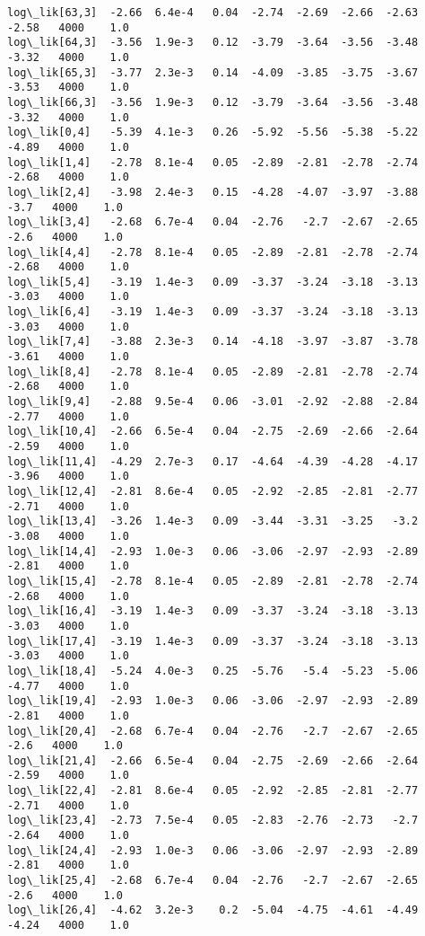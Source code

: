 \documentclass[11pt]{article}
\begin{document}
\begin{Verbatim}[commandchars=\\\{\}]
log\_lik[63,3]  -2.66  6.4e-4   0.04  -2.74  -2.69  -2.66  -2.63  -2.58   4000    1.0
log\_lik[64,3]  -3.56  1.9e-3   0.12  -3.79  -3.64  -3.56  -3.48  -3.32   4000    1.0
log\_lik[65,3]  -3.77  2.3e-3   0.14  -4.09  -3.85  -3.75  -3.67  -3.53   4000    1.0
log\_lik[66,3]  -3.56  1.9e-3   0.12  -3.79  -3.64  -3.56  -3.48  -3.32   4000    1.0
log\_lik[0,4]   -5.39  4.1e-3   0.26  -5.92  -5.56  -5.38  -5.22  -4.89   4000    1.0
log\_lik[1,4]   -2.78  8.1e-4   0.05  -2.89  -2.81  -2.78  -2.74  -2.68   4000    1.0
log\_lik[2,4]   -3.98  2.4e-3   0.15  -4.28  -4.07  -3.97  -3.88   -3.7   4000    1.0
log\_lik[3,4]   -2.68  6.7e-4   0.04  -2.76   -2.7  -2.67  -2.65   -2.6   4000    1.0
log\_lik[4,4]   -2.78  8.1e-4   0.05  -2.89  -2.81  -2.78  -2.74  -2.68   4000    1.0
log\_lik[5,4]   -3.19  1.4e-3   0.09  -3.37  -3.24  -3.18  -3.13  -3.03   4000    1.0
log\_lik[6,4]   -3.19  1.4e-3   0.09  -3.37  -3.24  -3.18  -3.13  -3.03   4000    1.0
log\_lik[7,4]   -3.88  2.3e-3   0.14  -4.18  -3.97  -3.87  -3.78  -3.61   4000    1.0
log\_lik[8,4]   -2.78  8.1e-4   0.05  -2.89  -2.81  -2.78  -2.74  -2.68   4000    1.0
log\_lik[9,4]   -2.88  9.5e-4   0.06  -3.01  -2.92  -2.88  -2.84  -2.77   4000    1.0
log\_lik[10,4]  -2.66  6.5e-4   0.04  -2.75  -2.69  -2.66  -2.64  -2.59   4000    1.0
log\_lik[11,4]  -4.29  2.7e-3   0.17  -4.64  -4.39  -4.28  -4.17  -3.96   4000    1.0
log\_lik[12,4]  -2.81  8.6e-4   0.05  -2.92  -2.85  -2.81  -2.77  -2.71   4000    1.0
log\_lik[13,4]  -3.26  1.4e-3   0.09  -3.44  -3.31  -3.25   -3.2  -3.08   4000    1.0
log\_lik[14,4]  -2.93  1.0e-3   0.06  -3.06  -2.97  -2.93  -2.89  -2.81   4000    1.0
log\_lik[15,4]  -2.78  8.1e-4   0.05  -2.89  -2.81  -2.78  -2.74  -2.68   4000    1.0
log\_lik[16,4]  -3.19  1.4e-3   0.09  -3.37  -3.24  -3.18  -3.13  -3.03   4000    1.0
log\_lik[17,4]  -3.19  1.4e-3   0.09  -3.37  -3.24  -3.18  -3.13  -3.03   4000    1.0
log\_lik[18,4]  -5.24  4.0e-3   0.25  -5.76   -5.4  -5.23  -5.06  -4.77   4000    1.0
log\_lik[19,4]  -2.93  1.0e-3   0.06  -3.06  -2.97  -2.93  -2.89  -2.81   4000    1.0
log\_lik[20,4]  -2.68  6.7e-4   0.04  -2.76   -2.7  -2.67  -2.65   -2.6   4000    1.0
log\_lik[21,4]  -2.66  6.5e-4   0.04  -2.75  -2.69  -2.66  -2.64  -2.59   4000    1.0
log\_lik[22,4]  -2.81  8.6e-4   0.05  -2.92  -2.85  -2.81  -2.77  -2.71   4000    1.0
log\_lik[23,4]  -2.73  7.5e-4   0.05  -2.83  -2.76  -2.73   -2.7  -2.64   4000    1.0
log\_lik[24,4]  -2.93  1.0e-3   0.06  -3.06  -2.97  -2.93  -2.89  -2.81   4000    1.0
log\_lik[25,4]  -2.68  6.7e-4   0.04  -2.76   -2.7  -2.67  -2.65   -2.6   4000    1.0
log\_lik[26,4]  -4.62  3.2e-3    0.2  -5.04  -4.75  -4.61  -4.49  -4.24   4000    1.0

\end{Verbatim}
\end{document}
